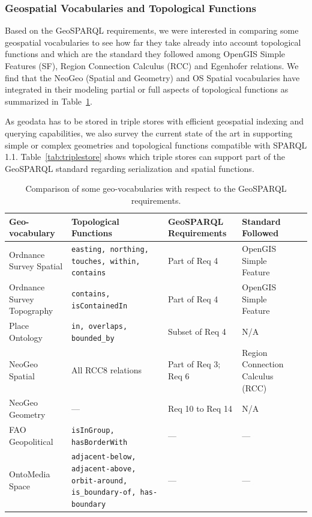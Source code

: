 \subsubsection{Geospatial Vocabularies and Topological Functions}
\label{sec:topofunc}

Based on the GeoSPARQL requirements, we were interested in comparing some geospatial vocabularies to see how far they take already into account topological functions and which are the standard they followed among OpenGIS Simple Features (SF), Region Connection Calculus (RCC) and Egenhofer relations. We find that the NeoGeo (Spatial and Geometry) and OS Spatial vocabularies have integrated in their modeling partial or full aspects of topological functions as summarized in Table~\ref{tab:geosparql}.

As geodata has to be stored in triple stores with efficient geospatial indexing and querying capabilities, we also survey the current state of the art  in supporting simple or complex geometries and topological functions compatible with SPARQL 1.1. Table~\ref{tab:triplestore} shows which triple stores can support part of the GeoSPARQL standard regarding serialization and spatial functions.
\begin{table}
\begin{tabularx}{\textwidth}{|X|X|X|X|l}
\hline
\textbf{Geo-vocabulary} & \textbf{Topological Functions} & \textbf{GeoSPARQL Requirements} & \textbf{Standard Followed}\\
\hline
Ordnance Survey Spatial & \texttt{easting, northing, touches, within, contains} & Part of Req 4 & OpenGIS Simple Feature\\ \hline
Ordnance Survey Topography & \texttt{contains, isContainedIn} & Part of Req 4 & OpenGIS Simple Feature\\ \hline
Place Ontology & \texttt{in, overlaps, bounded\_by} & Subset of Req 4 & N/A\\
\hline
NeoGeo Spatial & All RCC8 relations & Part of Req 3; Req 6 & Region Connection Calculus (RCC)\\
\hline
NeoGeo Geometry & --- & Req 10 to Req 14 & N/A\\
\hline
FAO Geopolitical & \texttt{isInGroup, hasBorderWith} & --- & ---\\
\hline
OntoMedia Space & \texttt{adjacent-below, adjacent-above, orbit-around, is\_boundary-of, has-boundary} & --- & ---\\
\hline
\end{tabularx}
\caption{Comparison of some geo-vocabularies with respect to the GeoSPARQL requirements.}
\label{tab:geosparql}
\end{table}

